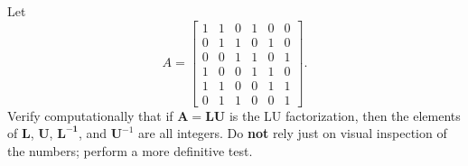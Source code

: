 \documentclass{article}
\newenvironment{problem}[2][Problem]{\begin{trivlist}
\item[\hskip \labelsep {\bfseries #1}\hskip \labelsep {\bfseries #2.}]}{\end{trivlist}}
\theoremstyle{definition}
\begin{document}
\begin{problem}{2.4.4}
    Let
    $$A = \begin{bmatrix*}
        1 & 1 & 0 & 1 & 0 & 0 \\
        0 & 1 & 1 & 0 & 1 & 0 \\
        0 & 0 & 1 & 1 & 0 & 1 \\
        1 & 0 & 0 & 1 & 1 & 0 \\
        1 & 1 & 0 & 0 & 1 & 1 \\
        0 & 1 & 1 & 0 & 0 & 1
    \end{bmatrix*}.$$
    Verify computationally that if $\mathbf{A} = \mathbf{L}\mathbf{U}$ is the LU factorization, then the elements of $\mathbf{L}$, $\mathbf{U}$, $\mathbf{L^{-1}}$, and $\mathbf{U}^{-1}$ are all integers. Do \textbf{not} rely just on visual inspection of the numbers; perform a more definitive test.
\end{problem}
\end{document}
